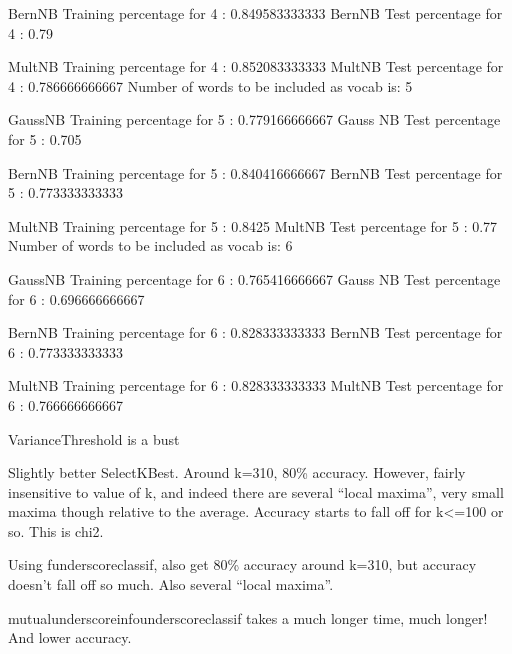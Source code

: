 BernNB Training percentage for 4 : 0.849583333333
BernNB Test percentage for 4 :     0.79

MultNB Training percentage for 4 : 0.852083333333
MultNB Test percentage for 4 :     0.786666666667
Number of words to be included as vocab is: 5

GaussNB Training percentage for 5 : 0.779166666667
Gauss NB Test percentage for 5 :     0.705

BernNB Training percentage for 5 : 0.840416666667
BernNB Test percentage for 5 :     0.773333333333

MultNB Training percentage for 5 : 0.8425
MultNB Test percentage for 5 :     0.77
Number of words to be included as vocab is: 6

GaussNB Training percentage for 6 : 0.765416666667
Gauss NB Test percentage for 6 :     0.696666666667

BernNB Training percentage for 6 : 0.828333333333
BernNB Test percentage for 6 :     0.773333333333

MultNB Training percentage for 6 : 0.828333333333
MultNB Test percentage for 6 :     0.766666666667

VarianceThreshold is a bust

Slightly better SelectKBest.  Around k=310, 80\% accuracy.  However, fairly insensitive to value of k, and indeed there are several ``local maxima'', very small maxima though relative to the average.  Accuracy starts to fall off for k<=100 or so.  This is chi2.

Using funderscoreclassif, also get 80\% accuracy around k=310, but accuracy doesn't fall off so much.  Also several ``local maxima''.

mutualunderscoreinfounderscoreclassif takes a much longer time, much longer!  And lower accuracy.